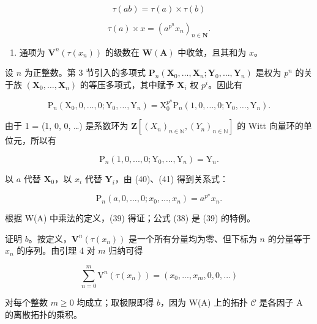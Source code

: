 \[
\tau (a b) = \tau (a) \times \tau (b)\tag{39}
\]

\[
\tau (a) \times x = (a ^ {p ^ {n}} x _ {n}) _ {n \in \mathbf {N}}.
\]

\begin{enumerate}
\def\labelenumi{\alph{enumi})}
\setcounter{enumi}{1}
\tightlist
\item
  通项为 \(\mathbf{V}^{n}(\tau(x_{n}))\) 的级数在 \(\mathbf{W}(\mathbf{A})\) 中收敛，且其和为 \(x\)。
\end{enumerate}

设 \(n\) 为正整数。第 3 节引入的多项式 \(\mathbf{P}_{n}(\mathbf{X}_{0},\ldots,\mathbf{X}_{n};\mathbf{Y}_{0},\ldots,\mathbf{Y}_{n})\) 是权为 \(p^{n}\) 的关于族 \((\mathbf{X}_{0},\ldots,\mathbf{X}_{n})\) 的等压多项式，其中赋予 \(\mathbf{X}_{i}\) 权 \(p^{i}\)。因此有

\[
\mathrm{P} _ {n} \left(\mathrm{X} _ {0}, 0, \dots , 0; \mathrm{Y} _ {0}, \dots , \mathrm{Y} _ {n}\right) = \mathrm{X} _ {0} ^ {p ^ {n}} \mathrm{P} _ {n} (1, 0, \dots , 0; \mathrm{Y} _ {0}, \dots , \mathrm{Y} _ {n}).\tag{40}
\]

由于 1 = (1, 0, 0, \ldots) 是系数环为 \(\mathbf{Z}[(X_n)_{n\in\mathbb{N}}, (Y_n)_{n\in\mathbb{N}}]\) 的 Witt 向量环的单位元，所以有

\[
\mathrm{P} _ {n} (1, 0,..., 0; \mathrm{Y} _ {0},..., \mathrm{Y} _ {n}) = \mathrm{Y} _ {n}.\tag{41}
\]

以 \(a\) 代替 \(\mathbf{X}_{0}\)，以 \(x_{i}\) 代替 \(\mathbf{Y}_{i}\)，由 (40)、(41) 得到关系式：

\[
\mathrm{P} _ {n} (a, 0, \dots , 0; x _ {0}, \dots , x _ {n}) = a ^ {p ^ {n}} x _ {n}.
\]

根据 W(A) 中乘法的定义，(39) 得证；公式 (38) 是 (39) 的特例。

证明 \(b\)。按定义，\(\mathbf{V}^{n}(\tau(x_{n}))\) 是一个所有分量均为零、但下标为 \(n\) 的分量等于 \(x_{n}\) 的序列。由引理 4 对 \(m\) 归纳可得

\[
\sum_ {n = 0} ^ {m} \mathrm{V} ^ {n} (\tau (x _ {n})) = (x _ {0},..., x _ {m}, 0, 0,...)
\]

对每个整数 \(m \geqslant 0\) 均成立；取极限即得 \(b\)，因为 W(A) 上的拓扑 \(\mathcal{C}\) 是各因子 A 的离散拓扑的乘积。

